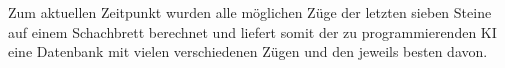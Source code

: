 Zum aktuellen Zeitpunkt wurden alle möglichen Züge der letzten sieben Steine auf einem Schachbrett berechnet und liefert somit der zu programmierenden KI eine Datenbank mit vielen verschiedenen Zügen und den jeweils besten davon.


